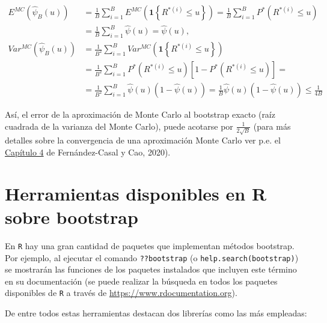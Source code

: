 \documentclass[
]{book}
\theoremstyle{break}
\theoremstyle{definition}
\theoremstyle{definition}
\theoremstyle{definition}
\theoremstyle{definition}
\theoremstyle{remark}
\begin{document}
\[\begin{aligned}
E^{MC}\left( \hat{\psi}_{B}\left( u \right) \right) &= \frac{1}{B}
\sum_{i=1}^{B}E^{MC}\left( \mathbf{1}\left\{ R^{\ast (i)}\leq
u\right\} \right) =\frac{1}{B}\sum_{i=1}^{B}P^{\ast}\left( R^{\ast \left(
i \right)}\leq u \right) \\
&= \frac{1}{B}\sum_{i=1}^{B}\hat{\psi}\left( u \right) =\hat{\psi}\left(
u \right), \\
Var^{MC}\left( \hat{\psi}_{B}\left( u \right) \right) &= \frac{1}{B^2}
\sum_{i=1}^{B}Var^{MC}\left( \mathbf{1}\left\{ R^{\ast (i)}\leq
u\right\} \right) \\
&= \frac{1}{B^2}\sum_{i=1}^{B}P^{\ast}\left( R^{\ast (i)
}\leq u \right) \left[ 1-P^{\ast}\left( R^{\ast (i)}\leq
u \right) \right] = \\
&= \frac{1}{B^2}\sum_{i=1}^{B}\hat{\psi}\left( u \right) \left( 1-\hat{\psi}
\left( u \right) \right) =\frac{1}{B}\hat{\psi}\left( u \right) \left( 1-\hat{
\psi}\left( u \right) \right) \leq \frac{1}{4B}
\end{aligned}\]

Así, el error de la aproximación de Monte Carlo al bootstrap exacto
(raíz cuadrada de la varianza del Monte Carlo), puede acotarse por
\(\frac{1}{2\sqrt{B}}\)
(para más detalles sobre la convergencia de una aproximación Monte Carlo ver p.e. el \href{https://rubenfcasal.github.io/simbook/cap4.html}{Capítulo 4} de Fernández-Casal y Cao, 2020).

\hypertarget{intro-paquetes}{%
\section{Herramientas disponibles en R sobre bootstrap}\label{intro-paquetes}}

En \texttt{R} hay una gran cantidad de paquetes que implementan métodos bootstrap.
Por ejemplo, al ejecutar el comando \texttt{??bootstrap} (o \texttt{help.search(\textquotesingle{}bootstrap\textquotesingle{})})
se mostrarán las funciones de los paquetes instalados que incluyen este término
en su documentación (se puede realizar la búsqueda en todos los paquetes disponibles
de \texttt{R} a través de \url{https://www.rdocumentation.org}).

De entre todos estas herramientas destacan dos librerías
como las más empleadas:
\end{document}
